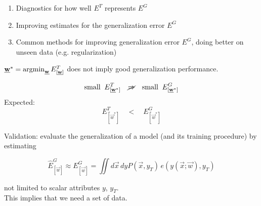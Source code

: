 \begin{frame}
\begin{enumerate}
\item Diagnostics for how well $E^T$ represents $E^G$
\item Improving estimates for the generalization error $E^G$
\item Common methods for improving generalization error $E^G$, doing better on unseen data (e.g. regularization)
\end{enumerate} 

\end{frame}


\begin{frame}

$\vec w^* = \argmin_{\vec w} E^T_{[\vec w]}$ does not imply good generalization performance.

\begin{equation}
\text{small} \;\; E^T_{[\vec w^*]} \quad \cancel{\Rightarrow}\quad \text{small} \;\;  E^G_{[\vec w^*]}
\end{equation}
Expected:
\begin{equation}
E^T_{[\vec w^*]} \quad <\quad E^G_{[\vec w^*]}
\end{equation}

Validation: evaluate the generalization of a model (and its training procedure) by estimating

\begin{equation}
\widehat E^G_{[\vec w]} \approx E^G_{[\vec w]} = \iint d \vec x \, d  y P(\vec x,  y_T) \, e( y(\vec x; \vec w), y_T) 
\end{equation}

not limited to scalar attributes $y$, $y_T$.\\

\pause
This implies that we need a set of data.
\pause
{}
\end{frame}
